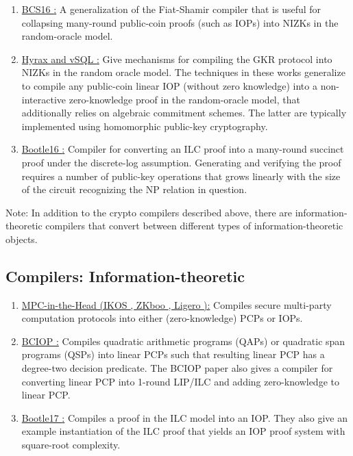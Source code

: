 \begin{enumerate}[label=\alph*.]
	\item \underline{BCS16 \cite{2016:tcc:IOPs}:} 
	A generalization of the Fiat-Shamir compiler that is useful for collapsing many-round public-coin proofs (such as IOPs) into NIZKs in the random-oracle model.

	\item \underline{Hyrax \cite{2018:SP:Doubly-efficient-zkSNARKs-without-trusted-setup} and vSQL \cite{2017:SP:vSQL}:} 
	Give mechanisms for compiling the GKR protocol \cite{2015:JACM:delegating-computation-interactive-proofs-for-muggles} into NIZKs in the random oracle model. 
	The techniques in these works generalize to compile any public-coin linear IOP (without zero knowledge) into a non-interactive zero-knowledge proof in the random-oracle model, that additionally relies on algebraic commitment schemes.
	The latter are typically implemented using homomorphic public-key cryptography.

	\item \underline{Bootle16 \cite{2016:eurocrypt:efficient-zk-args-for-arithmetic}:} 
	Compiler for converting an ILC proof into a many-round succinct proof under the discrete-log assumption. 
	Generating and verifying the proof requires a number of public-key operations that grows linearly with the size of the circuit recognizing the NP relation in question.
	\end{enumerate} 
	
		\vspace{1em}
	Note: In addition to the crypto compilers described above, there are information-theoretic compilers that convert between different types of information-theoretic objects.


\subsection{Compilers: Information-theoretic}
\label{paradigms:taxonomy:compilers-IT} 
	
	\begin{enumerate}[label=\alph*.]
  
	\item \underline{MPC-in-the-Head (IKOS \cite{2007:stoc:ZK-from-SMPC}, ZKboo \cite{2016:Sec:ZKBoo}, Ligero \cite{2017:ccs:ligero}):} 
	Compiles secure multi-party computation protocols into either (zero-knowledge) PCPs or IOPs.
  
	\item \underline{BCIOP \cite{2013:tcc:snargs-via-LIPs}:} 
	Compiles quadratic arithmetic programs (QAPs) or quadratic span programs (QSPs) into linear PCPs such that resulting linear PCP has a degree-two decision predicate. 
	The BCIOP paper also gives a compiler for converting linear PCP into 1-round LIP/ILC and adding zero-knowledge to linear PCP.
  
	\item \underline{Bootle17 \cite{2017:asiacrypt:linear-time-zkps-for-arithmetic}:} 
	Compiles a proof in the ILC model into an IOP.
	They also give an example instantiation of the ILC proof that yields an IOP proof system with square-root complexity.
	
	\end{enumerate}
